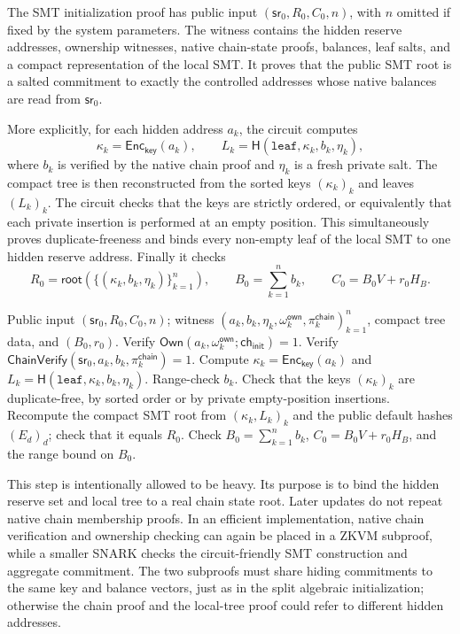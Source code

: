 \documentclass[runningheads]{llncs}
\newcommand{\Enc}{\mathsf{Enc}}
\newcommand{\CRH}{\mathsf{H}}
\newcommand{\sr}{\mathsf{sr}}
\newcommand{\Rel}{\mathcal{R}}
\newcommand{\rootof}{\mathsf{root}}
\begin{document}
The SMT initialization proof has public input \((\sr_0,R_0,C_0,n)\), with \(n\) omitted if fixed by the system parameters.  The witness contains the hidden reserve addresses, ownership witnesses, native chain-state proofs, balances, leaf salts, and a compact representation of the local SMT.  It proves that the public SMT root is a salted commitment to exactly the controlled addresses whose native balances are read from \(\sr_0\).

More explicitly, for each hidden address \(a_k\), the circuit computes
\[
        \kappa_k=\Enc_{\mathsf{key}}(a_k),
        \qquad
        L_k=\CRH(\mathtt{leaf},\kappa_k,b_k,\eta_k),
\]
where \(b_k\) is verified by the native chain proof and \(\eta_k\) is a fresh private salt.  The compact tree is then reconstructed from the sorted keys \((\kappa_k)_k\) and leaves \((L_k)_k\).  The circuit checks that the keys are strictly ordered, or equivalently that each private insertion is performed at an empty position.  This simultaneously proves duplicate-freeness and binds every non-empty leaf of the local SMT to one hidden reserve address.  Finally it checks
\[
        R_0=\rootof(\{(\kappa_k,b_k,\eta_k)\}_{k=1}^n),
        \qquad
        B_0=\sum_{k=1}^n b_k,
        \qquad
        C_0=B_0V+r_0H_B .
\]

\begin{algorithm}[H]
\caption{SMT initialization relation \(\Rel_{\mathsf{init}}^{\mathsf{smt}}\)}
\label{alg:smt-init-rel}
\begin{algorithmic}[1]
\Require Public input \((\sr_0,R_0,C_0,n)\); witness \((a_k,b_k,\eta_k,\omega_k^{\mathsf{own}},\pi_k^{\mathsf{chain}})_{k=1}^n\), compact tree data, and \((B_0,r_0)\).
    \State Verify \(\mathsf{Own}(a_k,\omega_k^{\mathsf{own}};\mathsf{ch}_{\mathsf{init}})=1\).
    \State Verify \(\mathsf{ChainVerify}(\sr_0,a_k,b_k,\pi_k^{\mathsf{chain}})=1\).
    \State Compute \(\kappa_k=\Enc_{\mathsf{key}}(a_k)\) and \(L_k=\CRH(\mathtt{leaf},\kappa_k,b_k,\eta_k)\).
    \State Range-check \(b_k\).
\EndFor
\State Check that the keys \((\kappa_k)_k\) are duplicate-free, by sorted order or by private empty-position insertions.
\State Recompute the compact SMT root from \((\kappa_k,L_k)_k\) and the public default hashes \((E_d)_d\); check that it equals \(R_0\).
\State Check \(B_0=\sum_{k=1}^nb_k\), \(C_0=B_0V+r_0H_B\), and the range bound on \(B_0\).
\end{algorithmic}
\end{algorithm}

This step is intentionally allowed to be heavy.  Its purpose is to bind the hidden reserve set and local tree to a real chain state root.  Later updates do not repeat native chain membership proofs.  In an efficient implementation, native chain verification and ownership checking can again be placed in a ZKVM subproof, while a smaller SNARK checks the circuit-friendly SMT construction and aggregate commitment.  The two subproofs must share hiding commitments to the same key and balance vectors, just as in the split algebraic initialization; otherwise the chain proof and the local-tree proof could refer to different hidden addresses.
\end{document}
